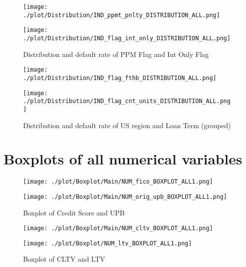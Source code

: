 \begin{figure}[H]
\begin{minipage}{.5\textwidth}
	\centering
	\texttt{[image: ./plot/Distribution/IND\_ppmt\_pnlty\_DISTRIBUTION\_ALL.png]}
\end{minipage}%
\begin{minipage}{.5\textwidth}
	\centering
	\texttt{[image: ./plot/Distribution/IND\_flag\_int\_only\_DISTRIBUTION\_ALL.png]}
\end{minipage}
    \caption{Distribution and default rate of PPM Flag and Int Only Flag}
\end{figure}

\begin{figure}[H]
\begin{minipage}{.5\textwidth}
	\centering
	\texttt{[image: ./plot/Distribution/IND\_flag\_fthb\_DISTRIBUTION\_ALL.png]}
\end{minipage}%
\begin{minipage}{.5\textwidth}
	\centering
	\texttt{[image: ./plot/Distribution/IND\_flag\_cnt\_units\_DISTRIBUTION\_ALL.png]}
\end{minipage}
    \caption{Distribution and default rate of US region and Loan Term (grouped)}
\end{figure}


\section{Boxplots of all numerical variables}
\label{sec:boxplot_all}

\begin{figure}[H]
\begin{minipage}{.5\textwidth}
	\centering
	\texttt{[image: ./plot/Boxplot/Main/NUM\_fico\_BOXPLOT\_ALL1.png]}
\end{minipage}%
\begin{minipage}{.5\textwidth}
	\centering
	\texttt{[image: ./plot/Boxplot/Main/NUM\_orig\_upb\_BOXPLOT\_ALL1.png]}
\end{minipage}
    \caption{Boxplot of Credit Score and UPB}
\end{figure}

\begin{figure}[H]
\begin{minipage}{.5\textwidth}
	\centering
	\texttt{[image: ./plot/Boxplot/Main/NUM\_cltv\_BOXPLOT\_ALL1.png]}
\end{minipage}%
\begin{minipage}{.5\textwidth}
	\centering
	\texttt{[image: ./plot/Boxplot/NUM\_ltv\_BOXPLOT\_ALL1.png]}
\end{minipage}
    \caption{Boxplot of CLTV and LTV}
\end{figure}

